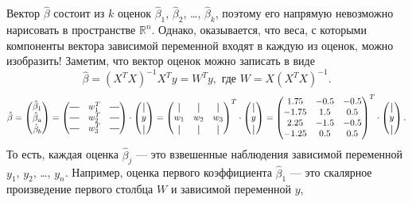 \documentclass[12pt]{article}
\newcommand*{\horzbar}{\rule[.5ex]{2.5ex}{0.5pt}}
\newcommand*{\vertbar}{\rule[-1ex]{0.5pt}{2.5ex}}
\newcommand{\RR}{\mathbb{R}}
\newcommand{\hb}{\hat{\beta}}
\begin{document}
Вектор $\hb$ состоит из $k$ оценок $\hb_1$, $\hb_2$, \dots, $\hb_k$, поэтому его напрямую невозможно нарисовать в пространстве $\RR^n$.
Однако, оказывается, что веса, с которыми компоненты вектора зависимой переменной входят в каждую из оценок, можно изобразить!
Заметим, что вектор оценок можно записать в виде
\[
\hb = (X^TX)^{-1} X^Ty = W^T y, \text{ где } W= X(X^TX)^{-1}.
\]
\[
\hb = \begin{pmatrix}
    \hb_1 \\
    \hb_a \\
    \hb_b \\
\end{pmatrix}= \begin{pmatrix}
    \horzbar & w_1^T & \horzbar \\
    \horzbar & w_2^T & \horzbar \\
    \horzbar & w_3^T & \horzbar \\    
\end{pmatrix} \cdot \begin{pmatrix}
    \vertbar \\
    y \\
    \vertbar
\end{pmatrix} = 
\begin{pmatrix}
    \vertbar & \vertbar & \vertbar \\
    w_1 & w_2 & w_3 \\
    \vertbar & \vertbar & \vertbar \\    
\end{pmatrix}^T\cdot \begin{pmatrix}
    \vertbar \\
    y \\
    \vertbar
\end{pmatrix} = \begin{pmatrix}
1.75 & -0.5 & -0.5 \\ 
-1.75 & 1.5 & 0.5 \\
2.25 & -1.5 & -0.5 \\
-1.25 & 0.5 & 0.5 \\
\end{pmatrix}^T\cdot \begin{pmatrix}
    \vertbar \\
    y \\
    \vertbar
\end{pmatrix}.
\]
То есть, каждая оценка $\hb_j$ — это взвешенные наблюдения зависимой переменной $y_1$, $y_2$, \dots, $y_n$.
Например, оценка первого коэффициента $\hb_1$ — это скалярное произведение первого столбца $W$ и зависимой переменной $y$,
\end{document}

